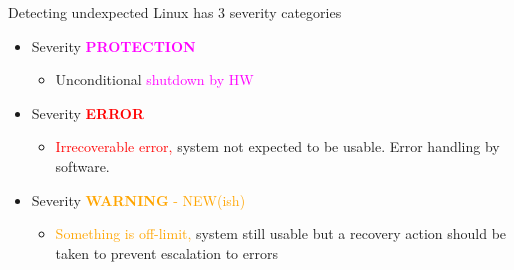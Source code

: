 \documentclass[10pt]{beamer}
\begin{document}
\begin{frame}{Detecting undexpected}
Linux has 3 severity categories
\begin{itemize}
	\item Severity \textcolor{magenta}{\textbf{PROTECTION}}
	\begin{itemize}
		\item Unconditional \textcolor{magenta}{shutdown by HW}
	\end{itemize}
	\item Severity \textcolor{red}{\textbf{ERROR}}
	\begin{itemize}
		\item \textcolor{red}{Irrecoverable error,} system not expected to be usable. Error handling by software.
	\end{itemize}
	\item Severity \textcolor{orange}{\textbf{WARNING} - NEW(ish)}
	\begin{itemize}
		\item \textcolor{orange}{Something is off-limit,} system still usable but a recovery action should be taken to prevent escalation to errors
	\end{itemize}
\end{itemize}
\end{frame}
\end{document}

